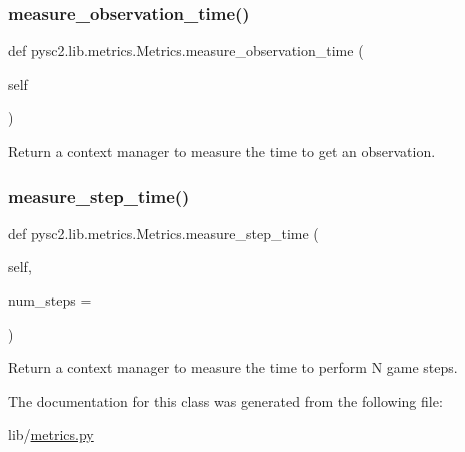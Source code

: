 \mbox{\label{classpysc2_1_1lib_1_1metrics_1_1_metrics_ac2559f001b888031e4c7ab49b651479a}} 
\subsubsection{\texorpdfstring{measure\+\_\+observation\+\_\+time()}{measure\_observation\_time()}}
{\footnotesize\ttfamily def pysc2.\+lib.\+metrics.\+Metrics.\+measure\+\_\+observation\+\_\+time (\begin{DoxyParamCaption}\item[{}]{self }\end{DoxyParamCaption})}

\begin{DoxyVerb}Return a context manager to measure the time to get an observation.\end{DoxyVerb}
 \mbox{\label{classpysc2_1_1lib_1_1metrics_1_1_metrics_a3b13b00f7ab9a0d97e61011db7b40794}} 
\subsubsection{\texorpdfstring{measure\+\_\+step\+\_\+time()}{measure\_step\_time()}}
{\footnotesize\ttfamily def pysc2.\+lib.\+metrics.\+Metrics.\+measure\+\_\+step\+\_\+time (\begin{DoxyParamCaption}\item[{}]{self,  }\item[{}]{num\+\_\+steps = {} }\end{DoxyParamCaption})}

\begin{DoxyVerb}Return a context manager to measure the time to perform N game steps.\end{DoxyVerb}
 

The documentation for this class was generated from the following file\+:\begin{DoxyCompactItemize}
\item 
lib/\mbox{\hyperlink{metrics_8py}{metrics.\+py}}\end{DoxyCompactItemize}

